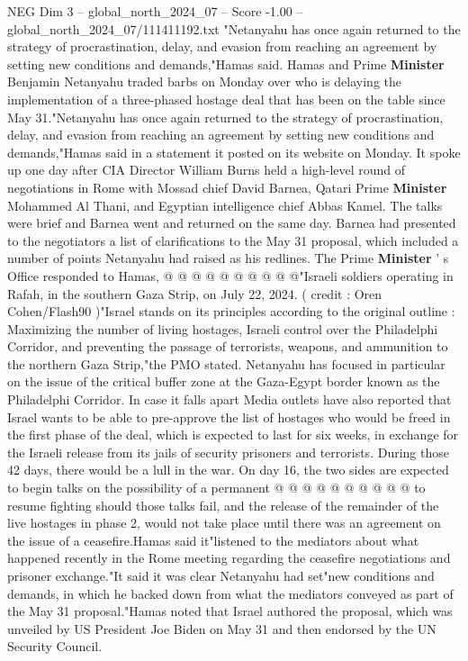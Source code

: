 \begin{textsample}{NEG Dim 3 – global\_north\_2024\_07 – Score -1.00 – global\_north\_2024\_07/111411192.txt}  \label{ex:f3_neg_372}
"Netanyahu has once again returned to the strategy of procrastination, delay, and evasion from reaching an agreement by setting new conditions and demands,"Hamas said.
Hamas and Prime \textbf{Minister} Benjamin Netanyahu traded barbs on Monday over who is delaying the implementation of a three-phased hostage deal that has been on the table since May 31."Netanyahu has once again returned to the strategy of procrastination, delay, and evasion from reaching an agreement by setting new conditions and demands,"Hamas said in a statement it posted on its website on Monday.
It spoke up one day after CIA Director William Burns held a high-level round of negotiations in Rome with Mossad chief David Barnea, Qatari Prime \textbf{Minister} Mohammed Al Thani, and Egyptian intelligence chief Abbas Kamel.
The talks were brief and Barnea went and returned on the same day.
Barnea had presented to the negotiators a list of clarifications to the May 31 proposal, which included a number of points Netanyahu had raised as his redlines.
The Prime \textbf{Minister} ' s Office responded to Hamas, @ @ @ @ @ @ @ @ @ @"Israeli soldiers operating in Rafah, in the southern Gaza Strip, on July 22, 2024. ( credit : Oren Cohen/Flash90 )"Israel stands on its principles according to the original outline : Maximizing the number of living hostages, Israeli control over the Philadelphi Corridor, and preventing the passage of terrorists, weapons, and ammunition to the northern Gaza Strip,"the PMO stated.
Netanyahu has focused in particular on the issue of the critical buffer zone at the Gaza-Egypt border known as the Philadelphi Corridor.
In case it falls apart Media outlets have also reported that Israel wants to be able to pre-approve the list of hostages who would be freed in the first phase of the deal, which is expected to last for six weeks, in exchange for the Israeli release from its jails of security prisoners and terrorists.
During those 42 days, there would be a lull in the war.
On day 16, the two sides are expected to begin talks on the possibility of a permanent @ @ @ @ @ @ @ @ @ @ to resume fighting should those talks fail, and the release of the remainder of the live hostages in phase 2, would not take place until there was an agreement on the issue of a ceasefire.Hamas said it"listened to the mediators about what happened recently in the Rome meeting regarding the ceasefire negotiations and prisoner exchange."It said it was clear Netanyahu had set"new conditions and demands, in which he backed down from what the mediators conveyed as part of the May 31 proposal."Hamas noted that Israel authored the proposal, which was unveiled by US President Joe Biden on May 31 and then endorsed by the UN Security Council.

\end{textsample}

